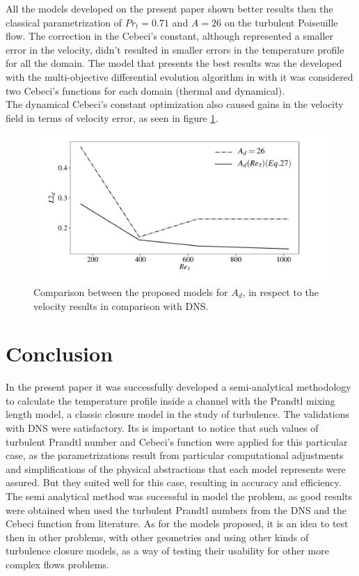 \documentclass[10pt]{article} %
\begin{document}
All the models developed on the present paper shown better results then the classical parametrization of $Pr_t = 0.71$ and $A = 26$ on the turbulent Poiseuille flow. The correction in the Cebeci's constant, although represented a smaller error in the velocity, didn't resulted in smaller errors in the temperature profile for all the domain. The model that presents the best results was the developed with the multi-objective differential evolution algorithm in with it was considered two Cebeci's functions for each domain (thermal and dynamical).\\

The dynamical Cebeci's constant optimization also caused gains in the velocity field in terms of velocity error, as seen in figure \ref{figure16}.

\begin{figure}[!h]
	\centering
	\includegraphics[angle=0, trim = {0mm 0mm 0mm 10mm}, scale=0.5]{fotos_formatacao_final/gerais_velo}
	\caption{Comparison between the proposed models for $A_d$, in respect to the velocity results in comparison with DNS.}
	\label{figure16}
\end{figure}

\section{Conclusion}

In the present paper it was successfully developed a semi-analytical methodology to calculate the temperature profile inside a channel with the Prandtl mixing length model, a classic closure model in the study of turbulence. The validations with DNS were satisfactory. Its is important to notice that such values of turbulent Prandtl number and Cebeci's function were applied for this particular case, as the parametrizations result from particular computational adjustments and simplifications of the physical abstractions that each model represents were assured. But they suited well for this case, resulting in accuracy and efficiency. The semi analytical method was successful in model the problem, as good results were obtained when used the turbulent Prandtl numbers from the DNS and the Cebeci function from literature. As for the models proposed, it is an idea to test then in other problems, with other geometries and using other kinds of turbulence closure models, as a way of testing their usability for other more complex flows problems.      
\end{document}
